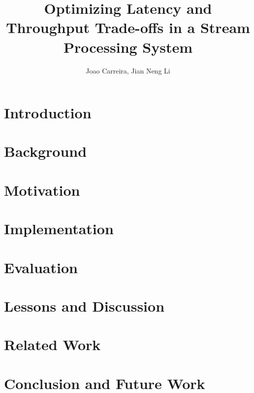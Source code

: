 \documentclass[10pt,twocolumn]{article}
\begin{document}
\title{{\bf Optimizing Latency and Throughput Trade-offs in a Stream Processing System}}
\author[1]{{Joao Carreira, Jian Neng Li}}
\date{}
\maketitle

\begin{abstract}
\noindent

\end{abstract}

\section{Introduction}


\section{Background}


\section{Motivation}


\section{Implementation}


\section{Evaluation}


\section{Lessons and Discussion}

\section{Related Work}


\section{Conclusion and Future Work}




\end{document}
